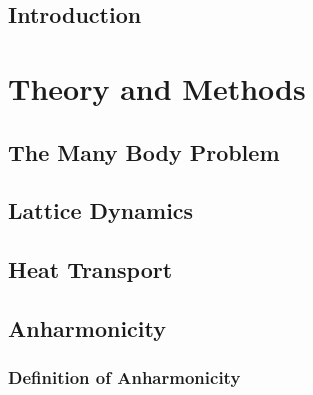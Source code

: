 \documentclass[nobib,a4paper,twoside,notoc,justified,marginals=justified]{tufte-book}
\newcommand{\blankpage}{\newpage\hbox{}\thispagestyle{empty}\newpage}
\begin{document}
  \frontmatter
  
%  

\tableofcontents





\cleardoublepage
{}
\chapter{Introduction}


\mainmatter

\part{Theory and Methods}

\chapter{The Many Body Problem}



\chapter{Lattice Dynamics}


\chapter{Heat Transport}


\chapter{Anharmonicity}
\section{Definition of Anharmonicity}
\end{document}
